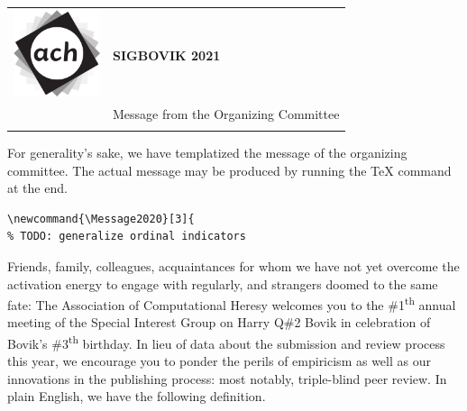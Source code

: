 \documentclass[12pt]{article}
\begin{document}
{\sffamily
\begin{tabular}{ll}
\multirow{3}{*}{\includegraphics[width=1in]{ach.png}}\\
& \textbf{\Huge{SIGBOVIK 2021}} \\ &\\
& \LARGE{Message from the Organizing Committee} \\
&\\
\hline
\end{tabular}}
\vspace{2em}
\thispagestyle{empty}

For generality’s sake, we have templatized the message of the organizing committee. The actual message may be produced by running the TeX command at the end.

\begin{verbatim}
\newcommand{\Message2020}[3]{
% TODO: generalize ordinal indicators
\end{verbatim}
Friends, family, colleagues, acquaintances for whom we have not yet overcome the activation energy to engage with regularly, and strangers doomed to the same fate: The Association of Computational Heresy welcomes you to the \#1\textsuperscript{th} annual meeting of the Special Interest Group on Harry Q\#2 Bovik in celebration of Bovik’s \#3\textsuperscript{th} birthday. In lieu of data about the submission and review process this year, we encourage you to ponder the perils of empiricism as well as our innovations in the publishing process: most notably, triple-blind peer review. In plain English, we have the following definition.\\
\end{document}
